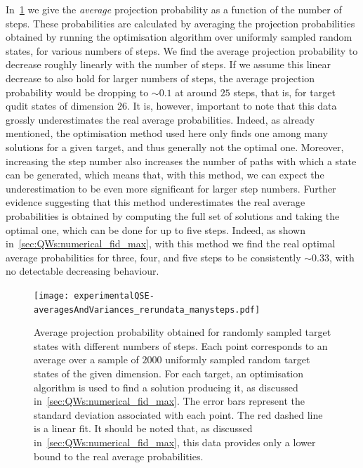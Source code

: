 In~\cref{fig:expQWs:avgProbabilitiesVsStepNumber} we give the \textit{average} projection probability as a function of the number of steps. These probabilities are calculated by averaging the projection probabilities obtained by running the optimisation algorithm over uniformly sampled random states, for various numbers of steps. We find the average projection probability to decrease roughly linearly with the number of steps. If we assume this linear decrease to also hold for larger numbers of steps, the average projection probability would be dropping to $\sim 0.1$ at around $25$ steps, that is, for target qudit states of dimension $26$.
It is, however, important to note that this data grossly underestimates the real average probabilities. Indeed, as already mentioned, the optimisation method used here only finds one among many solutions for a given target, and thus generally not the optimal one. Moreover, increasing the step number also increases the number of paths with which a state can be generated, which means that, with this method, we can expect the underestimation to be even more significant for larger step numbers.
Further evidence suggesting that this method underestimates the real average probabilities is obtained by computing the full set of solutions and taking the optimal one, which can be done for up to five steps. Indeed, as shown in~\cref{sec:QWs:numerical_fid_max}, with this method we find the real optimal average probabilities for three, four, and five steps to be consistently $\sim 0.33$, with no detectable decreasing behaviour.

\begin{figure}[tb]
    \centering
    \texttt{[image: experimentalQSE-averagesAndVariances\_rerundata\_manysteps.pdf]}
    \caption{
    	Average projection probability obtained for randomly sampled target states with different numbers of steps. Each point corresponds to an average over a sample of $2000$ uniformly sampled random target states of the given dimension. For each target, an optimisation algorithm is used to find a solution producing it, as discussed in~\cref{sec:QWs:numerical_fid_max}. The error bars represent the standard deviation associated with each point. The red dashed line is a linear fit. It should be noted that, as discussed in~\cref{sec:QWs:numerical_fid_max}, this data provides only a lower bound to the real average probabilities.%
    }
    \label{fig:expQWs:avgProbabilitiesVsStepNumber}
\end{figure}



